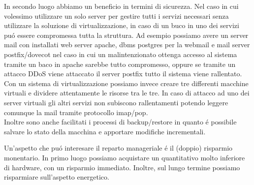 \documentclass[a4paper,10pt]{book}
\begin{document}
In secondo luogo abbiamo un beneficio in termini di sicurezza. Nel caso in cui volessimo utilizzare un solo server per gestire tutti i servizi necessari senza utilizzare la soluzione di virtualizzazione, in caso di un buco in uno dei servizi puó essere compromessa tutta la struttura. Ad esempio possiamo avere un server mail con installati web server apache, dbms postgres per la webmail e mail server postfix/dovecot nel caso in cui un malintenzionato ottenga accesso al sistema tramite un baco in apache sarebbe tutto compromesso, oppure se tramite un attacco DDoS viene attaccato il server postfix tutto il sistema viene rallentato. Con un sistema di virtualizzazione possiamo invece creare tre differenti macchine virtuali e dividere attentamente le risorse tra le tre. In caso di attacco ad uno dei server virtuali gli altri servizi non subiscono rallentamenti potendo leggere comunque la mail tramite protocollo imap/pop. \\
Inoltre sono anche facilitati i processi di backup/restore in quanto é possibile salvare lo stato della macchina e apportare modifiche incrementali.

Un'aspetto che puó interesare il reparto manageriale é il (doppio) risparmio monentario. In primo luogo possiamo acquistare un quantitativo molto inferiore di hardware, con un risparmio immediato. Inoltre, sul lungo termine possiamo risparmiare sull'aspetto energetico. 
\end{document}
